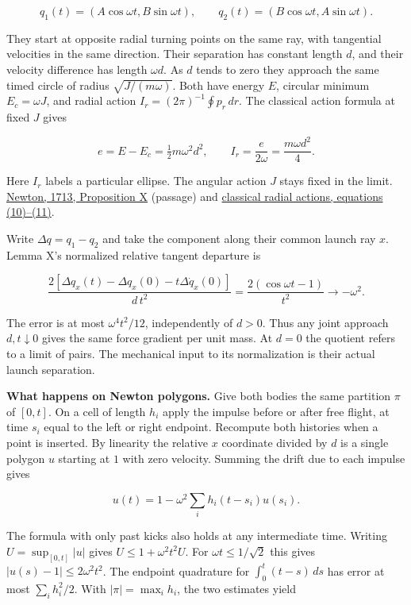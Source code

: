 \documentclass[11pt,a4paper]{article}
\begin{document}
\[
 q_1(t)=(A\cos\omega t,B\sin\omega t),\qquad
 q_2(t)=(B\cos\omega t,A\sin\omega t).
\]

They start at opposite radial turning points on the same ray, with
tangential velocities in the same direction. Their separation has
constant length \(d\), and their velocity difference has length
\(\omega d\). As \(d\) tends to zero they approach the same timed circle
of radius \(\sqrt{J/(m\omega)}\). Both have energy \(E\), circular
minimum \(E_c=\omega J\), and radial action \(I_r=(2\pi)^{-1}\oint
p_r\,dr\). The classical action formula at fixed \(J\) gives

\[
 e=E-E_c=\tfrac12m\omega^2d^2,\qquad
 I_r=\frac{e}{2\omega}=\frac{m\omega d^2}{4}.                       \tag{1}
\]

Here \(I_r\) labels a particular ellipse. The angular action \(J\) stays
fixed in the limit.
\href{https://www.newtonproject.ox.ac.uk/view/texts/diplomatic/NATP00082\#par114}{Newton,
1713, Proposition X} (passage) and
\href{https://arivero.github.io/navstokgap/notes/rivero-1998-conjecture-central-forces.html\#hooke-and-kepler-radial-actions-and-maslov-phases}{classical
radial actions, equations (10)--(11)}.

Write \(\Delta q=q_1-q_2\) and take the component along their common
launch ray \(x\). Lemma X's normalized relative tangent departure is

\[
 \frac{2[\Delta q_x(t)-\Delta q_x(0)-t\Delta\dot q_x(0)]}{d\,t^2}
 =\frac{2(\cos\omega t-1)}{t^2}
 \longrightarrow-\omega^2 .                                        \tag{2}
\]

The error is at most \(\omega^4t^2/12\), independently of \(d>0\). Thus
any joint approach \(d,t\downarrow0\) gives the same force gradient per
unit mass. At \(d=0\) the quotient refers to a limit of pairs. The
mechanical input to its normalization is their actual launch separation.

\textbf{What happens on Newton polygons.} Give both bodies the same
partition \(\pi\) of \([0,t]\). On a cell of length \(h_i\) apply the
impulse before or after free flight, at time \(s_i\) equal to the left
or right endpoint. Recompute both histories when a point is inserted. By
linearity the relative \(x\) coordinate divided by \(d\) is a single
polygon \(u\) starting at \(1\) with zero velocity. Summing the drift
due to each impulse gives

\[
 u(t)=1-\omega^2\sum_i h_i(t-s_i)u(s_i).
\]

The formula with only past kicks also holds at any intermediate time.
Writing \(U=\sup_{[0,t]}|u|\) gives \(U\le1+\omega^2t^2U\). For
\(\omega t\le1/\sqrt2\) this gives \(|u(s)-1|\le2\omega^2t^2\). The
endpoint quadrature for \(\int_0^t(t-s)\,ds\) has error at most
\(\sum_i h_i^2/2\). With \(|\pi|=\max_i h_i\), the two estimates yield
\end{document}
